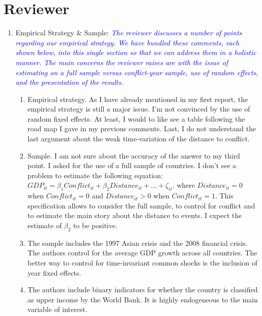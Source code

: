 \section*{Reviewer}

\begin{enumerate}
\item Empirical Strategy \& Sample: \textcolor{blue}{\emph{The reviewer discusses a number of points regarding our empirical strategy. We have bundled these comments, each shown below, into this single section so that we can address them in a holistic manner. The main concerns the reviewer raises are with the issue of estimating on a full sample versus conflict-year sample, use of random effects, and the presentation of the results.}} \\
\begin{enumerate}
	\item Empirical strategy. As I have already mentioned in my first report, the empirical strategy is still a major issue. I’m not convinced by the use of random fixed effects. At least, I would to like see a table following the road map I gave in my previous comments. Last, I do not understand the last argument about the weak time-variation of the distance to conflict. \\

	\item Sample. I am not sure about the accuracy of the answer to my third point. I asked for the use of a full sample of countries. I don’t see a problem to estimate the following equation: $GDP_{it} = \beta_{1}Conflict_{it} + \beta_{2}Distance_{it}+\ldots+\zeta_{it}$. where $Distance_{it}=0$ when $Conflict_{it}=0$ and $Distance_{it}>0$ when $Conflict_{it}=1$. This specification allows to consider the full sample, to control for conflict and to estimate the main story about the distance to events. I expect the estimate of $\beta_{2}$ to be positive. \\

	\item The sample includes the 1997 Asian crisis and the 2008 financial crisis. The authors control for the average GDP growth across all countries. The better way to control for time-invariant common shocks is the inclusion of year fixed effects. \\	

	\item The authors include binary indicators for whether the country is classified as upper income by the World Bank. It is highly endogeneous to the main variable of interest. \\	


\end{enumerate}
\end{enumerate}
